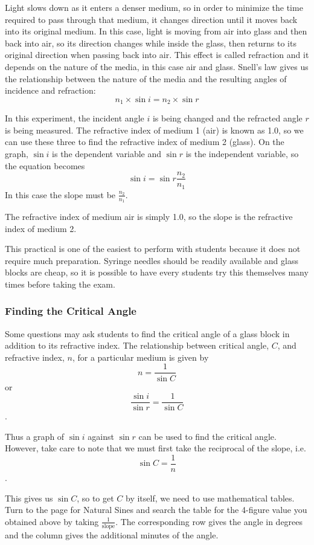 Light slows down as it enters a denser medium, so in order to minimize the time
required to pass through that medium, it changes direction until it moves back into its
original medium. In this case, light is moving from air into glass and then back into air,
so its direction changes while inside the glass, then returns to its original direction when
passing back into air. This effect is called refraction and it depends on the nature of the
media, in this case air and glass. Snell’s law gives us the relationship between the nature
of the media and the resulting angles of incidence and refraction:
$$n_1 \times \sin{i} = n_2 \times \sin{r}$$

In this experiment, the incident angle $i$ is being changed and the refracted angle $r$
is being measured. The refractive index of medium 1 (air) is known as 1.0, so we can use
these three to find the refractive index of medium 2 (glass). On the graph, $\sin{i}$ is the
dependent variable and $\sin{r}$ is the independent variable, so the equation becomes
$$\sin{i} = \sin{r} \frac{n_2}{n_1}$$
In this case the slope must be $\frac{n_2}{n_1}$.

The refractive index of medium air is simply 1.0, so the slope is the refractive index of
medium 2.

This practical is one of the easiest to perform with students because it does not
require much preparation. Syringe needles should be readily available and glass blocks are
cheap, so it is possible to have every students try this themselves many times before
taking the exam.

\subsubsection{Finding the Critical Angle} 
Some questions may ask students to find the critical angle of a glass block in addition to its refractive index. The relationship between critical angle, $C$, and refractive index, $n$, for a particular medium is given by 
$$n = \frac{1}{\sin{C}}$$ or $$\frac{\sin{i}}{\sin{r}} = \frac{1}{\sin{C}}$$.

Thus a graph of $\sin{i}$ against $\sin{r}$ can be used to find the critical angle. However, take care to note that we must first take the reciprocal of the slope, i.e.
$$\sin{C} = \frac{1}{n}$$.

This gives us $\sin{C}$, so to get $C$ by itself, we need to use mathematical tables. Turn to the page for Natural Sines and search the table for the 4-figure value you obtained above by taking $\frac{1}{\text{slope}}$. The corresponding row gives the angle in degrees and the column gives the additional minutes of the angle.

